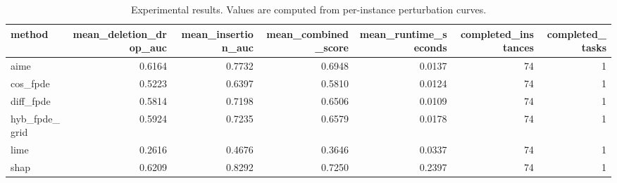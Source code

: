 \begin{table}[t]
\caption{Experimental results. Values are computed from per-instance perturbation curves.}
\label{tab:main_results_computed}
\centering
\begin{tabular}{lrrrrrr}
\toprule
method & mean\_deletion\_drop\_auc & mean\_insertion\_auc & mean\_combined\_score & mean\_runtime\_seconds & completed\_instances & completed\_tasks \\
\midrule
aime & 0.6164 & 0.7732 & 0.6948 & 0.0137 & 74 & 1 \\
cos\_fpde & 0.5223 & 0.6397 & 0.5810 & 0.0124 & 74 & 1 \\
diff\_fpde & 0.5814 & 0.7198 & 0.6506 & 0.0109 & 74 & 1 \\
hyb\_fpde\_grid & 0.5924 & 0.7235 & 0.6579 & 0.0178 & 74 & 1 \\
lime & 0.2616 & 0.4676 & 0.3646 & 0.0337 & 74 & 1 \\
shap & 0.6209 & 0.8292 & 0.7250 & 0.2397 & 74 & 1 \\
\bottomrule
\end{tabular}

\end{table}
